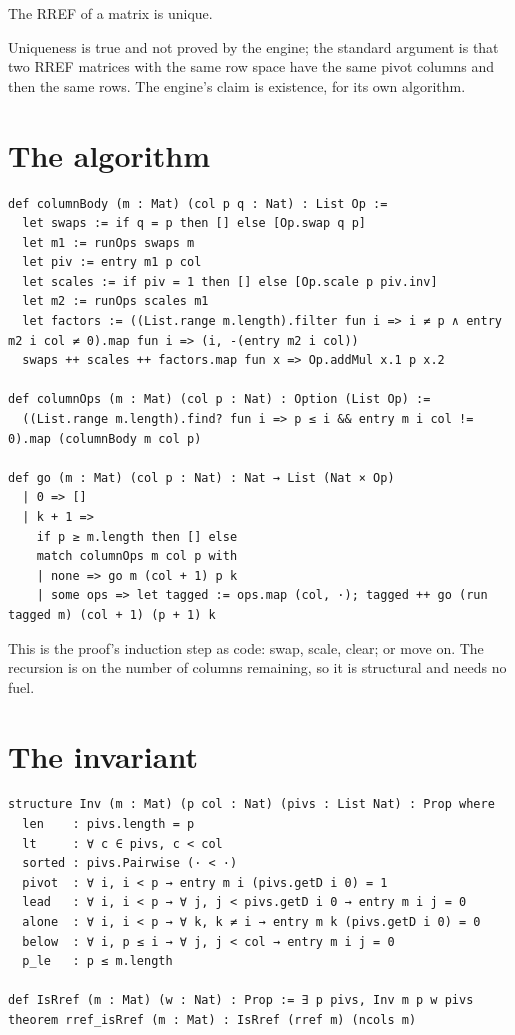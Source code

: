 \begin{theorem}[Uniqueness]
  The RREF of a matrix is unique.
\end{theorem}

Uniqueness is true and not proved by the engine; the standard argument is that two RREF matrices
with the same row space have the same pivot columns and then the same rows. The engine's claim is
existence, for its own algorithm.

\section{The algorithm}

\begin{verbatim}
def columnBody (m : Mat) (col p q : Nat) : List Op :=
  let swaps := if q = p then [] else [Op.swap q p]
  let m1 := runOps swaps m
  let piv := entry m1 p col
  let scales := if piv = 1 then [] else [Op.scale p piv.inv]
  let m2 := runOps scales m1
  let factors := ((List.range m.length).filter fun i => i ≠ p ∧ entry m2 i col ≠ 0).map fun i => (i, -(entry m2 i col))
  swaps ++ scales ++ factors.map fun x => Op.addMul x.1 p x.2

def columnOps (m : Mat) (col p : Nat) : Option (List Op) :=
  ((List.range m.length).find? fun i => p ≤ i && entry m i col != 0).map (columnBody m col p)

def go (m : Mat) (col p : Nat) : Nat → List (Nat × Op)
  | 0 => []
  | k + 1 =>
    if p ≥ m.length then [] else
    match columnOps m col p with
    | none => go m (col + 1) p k
    | some ops => let tagged := ops.map (col, ·); tagged ++ go (run tagged m) (col + 1) (p + 1) k
\end{verbatim}

This is the proof's induction step as code: swap, scale, clear; or move on. The recursion is on
the number of columns remaining, so it is structural and needs no fuel.

\section{The invariant}

\begin{verbatim}
structure Inv (m : Mat) (p col : Nat) (pivs : List Nat) : Prop where
  len    : pivs.length = p
  lt     : ∀ c ∈ pivs, c < col
  sorted : pivs.Pairwise (· < ·)
  pivot  : ∀ i, i < p → entry m i (pivs.getD i 0) = 1
  lead   : ∀ i, i < p → ∀ j, j < pivs.getD i 0 → entry m i j = 0
  alone  : ∀ i, i < p → ∀ k, k ≠ i → entry m k (pivs.getD i 0) = 0
  below  : ∀ i, p ≤ i → ∀ j, j < col → entry m i j = 0
  p_le   : p ≤ m.length

def IsRref (m : Mat) (w : Nat) : Prop := ∃ p pivs, Inv m p w pivs
theorem rref_isRref (m : Mat) : IsRref (rref m) (ncols m)
\end{verbatim}

